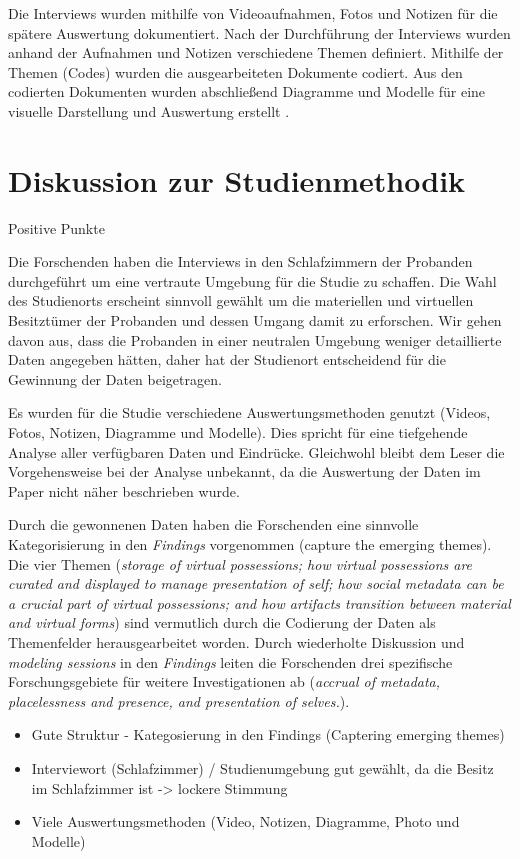\documentclass{hsflensburg}
\begin{document}
	Die Interviews wurden mithilfe von Videoaufnahmen, Fotos und Notizen für die spätere Auswertung dokumentiert. Nach der Durchführung
	der Interviews wurden anhand der Aufnahmen und Notizen verschiedene Themen
	definiert. Mithilfe der Themen (Codes) wurden die ausgearbeiteten
	Dokumente codiert. Aus den codierten Dokumenten wurden abschließend Diagramme und Modelle für eine visuelle Darstellung und Auswertung erstellt  \cite{odom2011teenagers}. 

	\section{Diskussion zur Studienmethodik}

	Positive Punkte

	Die Forschenden haben die Interviews in den Schlafzimmern der Probanden durchgeführt um eine vertraute Umgebung für die Studie zu schaffen. Die Wahl des Studienorts erscheint sinnvoll gewählt um die materiellen und virtuellen Besitztümer der Probanden und dessen Umgang damit zu erforschen. Wir gehen davon aus, dass die Probanden in einer neutralen Umgebung weniger detaillierte Daten angegeben hätten, daher hat der Studienort entscheidend für die Gewinnung der Daten beigetragen.

	Es wurden für die Studie verschiedene Auswertungsmethoden genutzt (Videos, Fotos, Notizen, Diagramme und Modelle). Dies spricht für eine tiefgehende Analyse aller verfügbaren Daten und Eindrücke. Gleichwohl bleibt dem Leser die Vorgehensweise bei der Analyse unbekannt, da die Auswertung der Daten im Paper nicht näher beschrieben wurde.   

	Durch die gewonnenen Daten haben die Forschenden eine sinnvolle Kategorisierung in den \textit{Findings} vorgenommen (capture the emerging themes). Die vier Themen (\textit{storage of virtual possessions; how virtual possessions are curated and displayed to manage presentation of self; how social metadata can be a crucial part of virtual possessions; and how artifacts transition between material and virtual forms}) sind vermutlich durch die Codierung der Daten als Themenfelder herausgearbeitet worden. Durch wiederholte Diskussion und \textit{modeling sessions} in den \textit{Findings} leiten die Forschenden drei spezifische Forschungsgebiete für weitere Investigationen ab (\textit{accrual of metadata, placelessness and presence, and presentation of selves.}).   

	\begin{itemize}
	\item Gute Struktur - Kategosierung in den Findings (Captering emerging themes)
 	\item Interviewort (Schlafzimmer) / Studienumgebung  gut gewählt, da die Besitz im Schlafzimmer ist -> lockere Stimmung
 	\item Viele Auswertungsmethoden (Video, Notizen, Diagramme, Photo und Modelle)
	\end{itemize}
\end{document}
